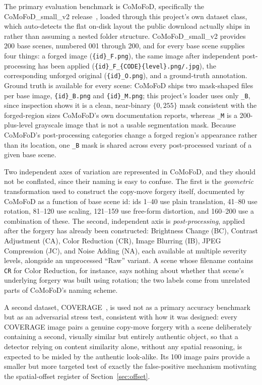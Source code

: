 \documentclass[conference]{IEEEtran}
\begin{document}
The primary evaluation benchmark is CoMoFoD, specifically the CoMoFoD\_small\_v2 release~\cite{comofod2013}, loaded through this project's own dataset class, which auto-detects the flat on-disk layout the public download actually ships in rather than assuming a nested folder structure. CoMoFoD\_small\_v2 provides 200 base scenes, numbered 001 through 200, and for every base scene supplies four things: a forged image (\texttt{\{id\}\_F.png}), the same image after independent post-processing has been applied (\texttt{\{id\}\_F\_\{CODE\}\{level\}.png/.jpg}), the corresponding unforged original (\texttt{\{id\}\_O.png}), and a ground-truth annotation. Ground truth is available for every scene: CoMoFoD ships two mask-shaped files per base image, \texttt{\{id\}\_B.png} and \texttt{\{id\}\_M.png}; this project's loader uses only \texttt{\_B}, since inspection shows it is a clean, near-binary $\{0, 255\}$ mask consistent with the forged-region sizes CoMoFoD's own documentation reports, whereas \texttt{\_M} is a 200-plus-level grayscale image that is not a usable segmentation mask. Because CoMoFoD's post-processing categories change a forged region's appearance rather than its location, one \texttt{\_B} mask is shared across every post-processed variant of a given base scene.

Two independent axes of variation are represented in CoMoFoD, and they should not be conflated, since their naming is easy to confuse. The first is the \emph{geometric} transformation used to construct the copy-move forgery itself, documented by CoMoFoD as a function of base scene id: ids 1--40 use plain translation, 41--80 use rotation, 81--120 use scaling, 121--159 use free-form distortion, and 160--200 use a combination of these. The second, independent axis is \emph{post-processing}, applied after the forgery has already been constructed: Brightness Change (BC), Contrast Adjustment (CA), Color Reduction (CR), Image Blurring (IB), JPEG Compression (JC), and Noise Adding (NA), each available at multiple severity levels, alongside an unprocessed ``Raw'' variant. A scene whose filename contains \texttt{CR} for Color Reduction, for instance, says nothing about whether that scene's underlying forgery was built using rotation; the two labels come from unrelated parts of CoMoFoD's naming scheme.

A second dataset, COVERAGE~\cite{coverage2016}, is used not as a primary accuracy benchmark but as an adversarial stress test, consistent with how it was designed: every COVERAGE image pairs a genuine copy-move forgery with a scene deliberately containing a second, visually similar but entirely authentic object, so that a detector relying on content similarity alone, without any spatial reasoning, is expected to be misled by the authentic look-alike. Its 100 image pairs provide a smaller but more targeted test of exactly the false-positive mechanism motivating the spatial-offset register of Section~\ref{sec:offset}.
\end{document}
